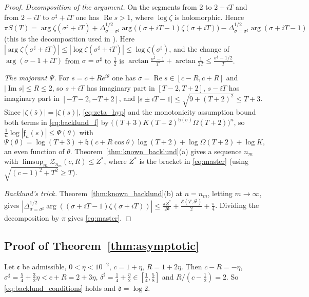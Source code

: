 \documentclass[11pt,a4paper]{article}
\makeatletter
\numberwithin{equation}{section}
\DeclareRobustCommand{\CGref}[1]{\ref{#1}}
\DeclareRobustCommand{\CGeqref}[1]{\eqref{#1}}
\DeclareRobustCommand{\CGcite}[2][]{\if\relax\detokenize{#1}\relax\cite{#2}\else\cite[#1]{#2}\fi}
\let\CG@origref\ref
\let\CG@origeqref\eqref
\newcommand{\CG@gettip}[1]{\@ifundefined{CGTip@#1}{#1}{\csname CGTip@#1\endcsname}}
\newcommand{\CG@getbib}[1]{\@ifundefined{CGBib@#1}{#1}{\csname CGBib@#1\endcsname}}
\DeclareRobustCommand{\CGref}[1]{\pdftooltip{\CG@origref{#1}}{\CG@gettip{#1}}}
\DeclareRobustCommand{\CGeqref}[1]{\pdftooltip{\CG@origeqref{#1}}{\CG@gettip{#1}}}
\DeclareRobustCommand{\CGcite}[2][]{\pdftooltip{\if\relax\detokenize{#1}\relax\cite{#2}\else\cite[#1]{#2}\fi}{\CG@getbib{#2}}}
\theoremstyle{definition}
\theoremstyle{remark}
\makeatother
\begin{document}
\begin{proof}
\emph{Decomposition of the argument.} On the segments from $2$ to $2+iT$ and from $2+iT$ to $\sigma^\sharp+iT$ one has $\operatorname{Re}s>1$, where $\log\zeta$ is holomorphic. Hence
\begin{equation}
\pi S(T)=\arg\zeta(\sigma^\sharp+iT)+\Delta_{\sigma=\sigma^\sharp}^{1/2}\arg\bigl((\sigma+iT-1)\zeta(\sigma+iT)\bigr)-\Delta_{\sigma=\sigma^\sharp}^{1/2}\arg(\sigma+iT-1)
\label{eq:disp_13}
\end{equation}
(this is the decomposition used in \CGcite[\S3]{BellottiWong2025}). Here $|\arg\zeta(\sigma^\sharp+iT)|\le|\log\zeta(\sigma^\sharp+iT)|\le\log\zeta(\sigma^\sharp)$, and the change of $\arg(\sigma-1+iT)$ from $\sigma=\sigma^\sharp$ to $\frac12$ is $\arctan\frac{\sigma^\sharp-1}T+\arctan\frac1{2T}\le\frac{\sigma^\sharp-1/2}T$.

\emph{The majorant $\Psi$.} For $s=c+Re^{i\theta}$ one has $\sigma=\operatorname{Re}s\in[c-R,c+R]$ and $|\operatorname{Im}s|\le R\le2$, so $s+iT$ has imaginary part in $[T-2,T+2]$, $s-iT$ has imaginary part in $[-T-2,-T+2]$, and $|s\pm iT-1|\le\sqrt{9+(T+2)^2}\le T+3$. Since $|\zeta(\bar s)|=|\zeta(s)|$, \CGeqref{eq:zeta_hyp} and the monotonicity assumption bound both terms in \CGeqref{eq:backlund_f} by $\bigl((T+3)K(T+2)^{\mathfrak h(\sigma)}\Omega(T+2)\bigr)^n$, so $\frac1n\log|\mathfrak f_n(s)|\le\Psi(\theta)$ with
\begin{equation}
\Psi(\theta)=\log(T+3)+\mathfrak h(c+R\cos\theta)\log(T+2)+\log\Omega(T+2)+\log K,
\label{eq:disp_14}
\end{equation}
an even function of $\theta$. Theorem~\CGref{thm:known_backlund}(a) gives a sequence $n_m$ with $\limsup_m\mathcal Z_{n_m}(c,R)\le Z^*$, where $Z^*$ is the bracket in \CGeqref{eq:master} (using $\sqrt{(c-1)^2+T^2}\ge T$).

\emph{Backlund's trick.} Theorem~\CGref{thm:known_backlund}(b) at $n=n_m$, letting $m\to\infty$, gives $|\Delta_{\sigma=\sigma^\sharp}^{1/2}\arg((\sigma+iT-1)\zeta(\sigma+iT))|\le\frac{\pi Z^*}{2\mathfrak d}+\frac{\mathcal E(T,\delta^\sharp)}2+\frac\pi4$. Dividing the decomposition by $\pi$ gives \CGeqref{eq:master}.
\end{proof}

\subsection{Proof of Theorem~\ref{thm:asymptotic}}\label{subsec:proof_asymptotic}
Let $\mathfrak e$ be admissible, $0<\eta<10^{-2}$, $c=1+\eta$, $R=1+2\eta$. Then $c-R=-\eta$, $\sigma^\sharp=\frac54+\frac32\eta<c+R=2+3\eta$, $\delta^\sharp=\frac14+\frac\eta2\in[\frac14,\frac58]$ and $R/(c-\frac12)=2$. So \CGeqref{eq:backlund_conditions} holds and $\mathfrak d=\log2$.
\end{document}
